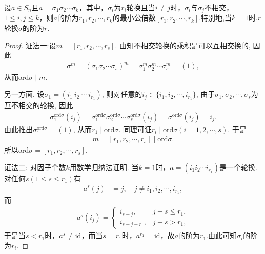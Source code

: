 \documentclass[../../main.tex]{subfiles}%
\begin{document}
\begin{theorem}[Ruffini定理]\label{theorem:抽象代数--Ruffini(鲁菲尼)定理}
设$a \in S_n$且$a = \sigma_1 \sigma_2 \cdots \sigma_k$，其中，$\sigma_i$为$r_i$轮换且当$i \neq j$时，$\sigma_i$与$\sigma_j$不相交，$1 \leqslant i, j \leqslant k$，则$a$的阶为$r_1, r_2, \cdots, r_k$的最小公倍数$[r_1, r_2, \cdots, r_k]$.特别地,当$k=1$时,$r$轮换$\sigma$的阶为$r$.
\end{theorem}
\begin{proof}

{\color{blue}证法一:}设$m = [r_1, r_2, \cdots, r_s]$. 由知不相交轮换的乘积是可以互相交换的, 因此
\begin{align*}
\sigma ^m=\left( \sigma _1\sigma _2\cdots \sigma _s \right) ^m=\sigma _{1}^{m}\sigma _{2}^{m}\cdots \sigma _{s}^{m}=(1),
\end{align*}
从而$\text{ord}\sigma \mid m$.

另一方面, 设$\sigma_1 = (i_1\ i_2\ \cdots\ i_{r_1})$, 则对任意的$i_j \in \{i_1, i_2, \cdots, i_{r_1}\}$, 由于$\sigma_1, \sigma_2, \cdots, \sigma_s$为互不相交的轮换, 因此
\begin{align*}
\sigma_1^{\text{ord}\sigma}(i_j) = \sigma_1^{\text{ord}\sigma}\sigma_2^{\text{ord}\sigma}\cdots\sigma_s^{\text{ord}\sigma}(i_j) 
= \sigma^{\text{ord}\sigma}(i_j) = i_j.
\end{align*}
由此推出$\sigma_1^{\text{ord}\sigma} = (1)$, 从而$r_1 \mid \text{ord}\sigma$. 同理可证$r_i \mid \text{ord}\sigma(i = 1, 2, \cdots, s)$. 于是
\begin{align*}
m = [r_1, r_2, \cdots, r_s] \mid \text{ord}\sigma.
\end{align*}
所以$\text{ord}\sigma = [r_1, r_2, \cdots, r_s].$

{\color{blue}证法二:}
对因子个数$k$用数学归纳法证明. 当$k = 1$时，$a = (i_1 i_2 \cdots i_{r_1})$是一个轮换. 对任何$s(1 \leqslant s \leqslant r_1)$有
\begin{align*}
a^s(j) &= j, \quad j \neq i_1, i_2, \cdots, i_{r_1},
\end{align*}
而
\begin{align*}
a^s(i_j) = \begin{cases}
i_{s+j}, & j + s \leqslant r_1, \\
i_{s+j - r_1}, & j + s > r_1,
\end{cases}
\end{align*}
于是当$s < r_1$时，$a^s \neq \text{id}$，而当$s = r_1$时，$a^{r_1} = \text{id}$，故$a$的阶为$r_1$.由此可知$\sigma_i$的阶为$r_i.$


\end{proof}
\end{document}
